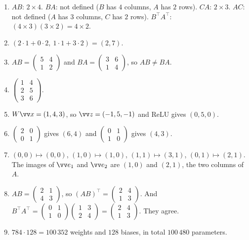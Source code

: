 \begin{enumerate}[label=\textbf{\ansnum.\arabic*}]
  \item $AB$: $2\times4$. $BA$: not defined ($B$ has $4$ columns, $A$ has $2$ rows). $CA$: $2\times3$. $AC$: not defined ($A$ has $3$ columns, $C$ has $2$ rows). $B^\top A^\top$: $(4\times3)(3\times2)=4\times2$.
  \item $(2\cdot1+0\cdot2,\ 1\cdot1+3\cdot2)=(2,7)$.
  \item $AB=\begin{pmatrix}5&4\\1&2\end{pmatrix}$ and $BA=\begin{pmatrix}3&6\\1&4\end{pmatrix}$, so $AB\neq BA$.
  \item $\begin{pmatrix}1&4\\2&5\\3&6\end{pmatrix}$.
  \item $W\vv x=(1,4,3)$, so $\vv z=(-1,5,-1)$ and ReLU gives $(0,5,0)$.
  \item $\begin{pmatrix}2&0\\0&1\end{pmatrix}$ gives $(6,4)$ and $\begin{pmatrix}0&1\\1&0\end{pmatrix}$ gives $(4,3)$.
  \item $(0,0)\mapsto(0,0)$, $(1,0)\mapsto(1,0)$, $(1,1)\mapsto(3,1)$, $(0,1)\mapsto(2,1)$. The images of $\vv e_1$ and $\vv e_2$ are $(1,0)$ and $(2,1)$, the two columns of $A$.
  \item $AB=\begin{pmatrix}2&1\\4&3\end{pmatrix}$, so $(AB)^\top=\begin{pmatrix}2&4\\1&3\end{pmatrix}$. And $B^\top A^\top=\begin{pmatrix}0&1\\1&0\end{pmatrix}\begin{pmatrix}1&3\\2&4\end{pmatrix}=\begin{pmatrix}2&4\\1&3\end{pmatrix}$. They agree.
  \item $784\cdot128=100\,352$ weights and $128$ biases, in total $100\,480$ parameters.
\end{enumerate}
